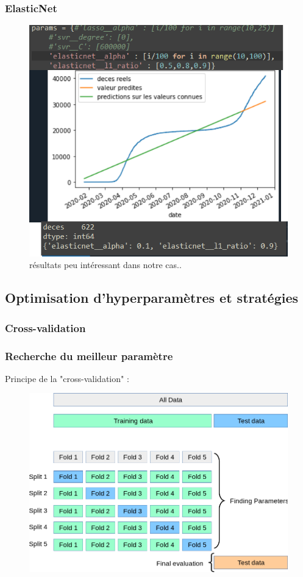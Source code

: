 \documentclass{beamer}
\begin{document}
\begin{frame}
	\frametitle{ElasticNet}
	
	\begin{figure}[b]
		\includegraphics[scale=0.35]{EN}
		\centering
		\caption{résultats peu intéressant dans notre cas..}
	\end{figure}
\end{frame}

\subsection{Optimisation d'hyperparamètres et stratégies}
\subsubsection{Cross-validation}
\begin{frame}
	\frametitle{Recherche du meilleur paramètre}
	Principe de la  "cross-validation" :
	\begin{figure}[b]
		\centering
		\includegraphics[scale=0.27]{gscv}
	\end{figure}
\end{frame}
\end{document}
